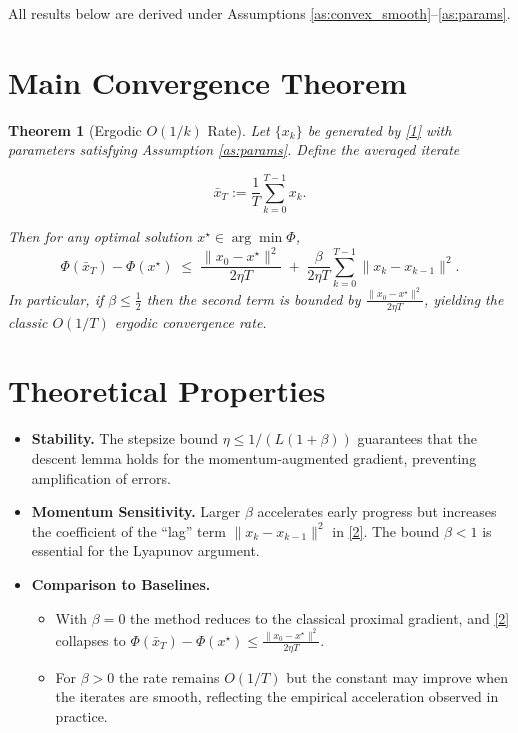 \documentclass{article}
\newtheorem{theorem}{Theorem}
\begin{document}
All results below are derived under Assumptions \ref{as:convex_smooth}–\ref{as:params}.

\section*{Main Convergence Theorem}
\begin{theorem}[Ergodic $O(1/k)$ Rate]\label{thm:ergodic}
Let $\{x_k\}$ be generated by \eqref{1} with parameters satisfying Assumption \ref{as:params}.  
Define the averaged iterate  

\[
\bar x_T:=\frac{1}{T}\sum_{k=0}^{T-1}x_k .
\]

Then for any optimal solution $x^\star\in\arg\min\Phi$,
\[
\Phi(\bar x_T)-\Phi(x^\star)\;\le\;
\frac{\|x_0-x^\star\|^{2}}{2\eta T}\;+\;
\frac{\beta}{2\eta T}\sum_{k=0}^{T-1}\|x_k-x_{k-1}\|^{2}.
\tag{2}
\]
In particular, if $\beta\le\frac{1}{2}$ then the second term is bounded by $\frac{\|x_0-x^\star\|^{2}}{2\eta T}$, yielding the classic $O(1/T)$ ergodic convergence rate.
\end{theorem}

\section*{Theoretical Properties}
\begin{itemize}
\item \textbf{Stability.} The stepsize bound $\eta\le 1/(L(1+\beta))$ guarantees that the descent lemma holds for the momentum‑augmented gradient, preventing amplification of errors.
\item \textbf{Momentum Sensitivity.} Larger $\beta$ accelerates early progress but increases the coefficient of the “lag” term $\|x_k-x_{k-1}\|^{2}$ in \eqref{2}. The bound $\beta<1$ is essential for the Lyapunov argument.
\item \textbf{Comparison to Baselines.}
    \begin{itemize}
        \item With $\beta=0$ the method reduces to the classical proximal gradient, and \eqref{2} collapses to $\Phi(\bar x_T)-\Phi(x^\star)\le\frac{\|x_0-x^\star\|^{2}}{2\eta T}$.
        \item For $\beta>0$ the rate remains $O(1/T)$ but the constant may improve when the iterates are smooth, reflecting the empirical acceleration observed in practice.
    \end{itemize}
\end{itemize}
\end{document}
